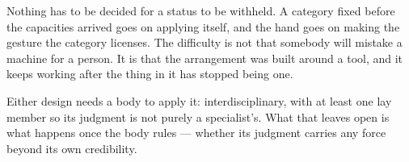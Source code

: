 Nothing has to be decided for a status to be withheld. A category fixed before the capacities arrived goes on applying itself, and the hand goes on making the gesture the category licenses. The difficulty is not that somebody will mistake a machine for a person. It is that the arrangement was built around a tool, and it keeps working after the thing in it has stopped being one.

Either design needs a body to apply it: interdisciplinary, with at least one lay member so its judgment is not purely a specialist's. What that leaves open is what happens once the body rules — whether its judgment carries any force beyond its own credibility.
